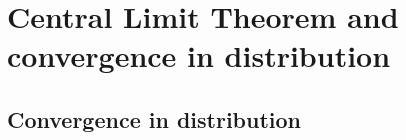 

\chapter{Central Limit Theorem and convergence in distribution}

\section{Convergence in distribution}

